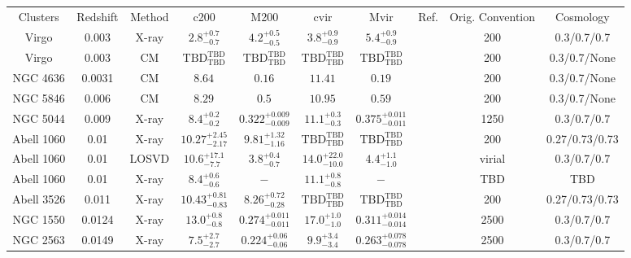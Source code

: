 \begin{table}
\begin{tabular}{cccccccccc}
Clusters & Redshift & Method & c200 & M200 & cvir & Mvir & Ref. & Orig. Convention & Cosmology \\
Virgo & 0.003 & X-ray & ${2.8}^{+0.7}_{-0.7}$ & ${4.2}^{+0.5}_{-0.5}$ & ${3.8}^{+0.9}_{-0.9}$ & ${5.4}^{+0.9}_{-0.9}$ & \citet{MC99.1} & 200 & 0.3/0.7/0.7 \\
Virgo & 0.003 & CM & ${\mathrm{TBD}}^{\mathrm{TBD}}_{\mathrm{TBD}}$ & ${\mathrm{TBD}}^{\mathrm{TBD}}_{\mathrm{TBD}}$ & ${\mathrm{TBD}}^{\mathrm{TBD}}_{\mathrm{TBD}}$ & ${\mathrm{TBD}}^{\mathrm{TBD}}_{\mathrm{TBD}}$ & \citet{RI06.1} & 200 & 0.3/0.7/None \\
NGC 4636 & 0.0031 & CM & ${8.64}^{}_{}$ & ${0.16}^{}_{}$ & ${11.41}^{}_{}$ & ${0.19}^{}_{}$ & \citet{RI06.1} & 200 & 0.3/0.7/None \\
NGC 5846 & 0.006 & CM & ${8.29}^{}_{}$ & ${0.5}^{}_{}$ & ${10.95}^{}_{}$ & ${0.59}^{}_{}$ & \citet{RI06.1} & 200 & 0.3/0.7/None \\
NGC 5044 & 0.009 & X-ray & ${8.4}^{+0.2}_{-0.2}$ & ${0.322}^{+0.009}_{-0.009}$ & ${11.1}^{+0.3}_{-0.3}$ & ${0.375}^{+0.011}_{-0.011}$ & \citet{GA06.1} & 1250 & 0.3/0.7/0.7 \\
Abell 1060 & 0.01 & X-ray & ${10.27}^{+2.45}_{-2.17}$ & ${9.81}^{+1.32}_{-1.16}$ & ${\mathrm{TBD}}^{\mathrm{TBD}}_{\mathrm{TBD}}$ & ${\mathrm{TBD}}^{\mathrm{TBD}}_{\mathrm{TBD}}$ & \citet{BA14.1} & 200 & 0.27/0.73/0.73 \\
Abell 1060 & 0.01 & LOSVD & ${10.6}^{+17.1}_{-7.7}$ & ${3.8}^{+0.4}_{-0.7}$ & ${14.0}^{+22.0}_{-10.0}$ & ${4.4}^{+1.1}_{-1.0}$ & \citet{LO06.1} & virial & 0.3/0.7/0.7 \\
Abell 1060 & 0.01 & X-ray & ${8.4}^{+0.6}_{-0.6}$ & ${-}^{}_{}$ & ${11.1}^{+0.8}_{-0.8}$ & ${-}^{}_{}$ & \citet{XU01.1} & TBD & TBD \\
Abell 3526 & 0.011 & X-ray & ${10.43}^{+0.81}_{-0.83}$ & ${8.26}^{+0.72}_{-0.28}$ & ${\mathrm{TBD}}^{\mathrm{TBD}}_{\mathrm{TBD}}$ & ${\mathrm{TBD}}^{\mathrm{TBD}}_{\mathrm{TBD}}$ & \citet{BA14.1} & 200 & 0.27/0.73/0.73 \\
NGC 1550 & 0.0124 & X-ray & ${13.0}^{+0.8}_{-0.8}$ & ${0.274}^{+0.011}_{-0.011}$ & ${17.0}^{+1.0}_{-1.0}$ & ${0.311}^{+0.014}_{-0.014}$ & \citet{GA06.1} & 2500 & 0.3/0.7/0.7 \\
NGC 2563 & 0.0149 & X-ray & ${7.5}^{+2.7}_{-2.7}$ & ${0.224}^{+0.06}_{-0.06}$ & ${9.9}^{+3.4}_{-3.4}$ & ${0.263}^{+0.078}_{-0.078}$ & \citet{GA06.1} & 2500 & 0.3/0.7/0.7 \\

\end{tabular}
\end{table}
